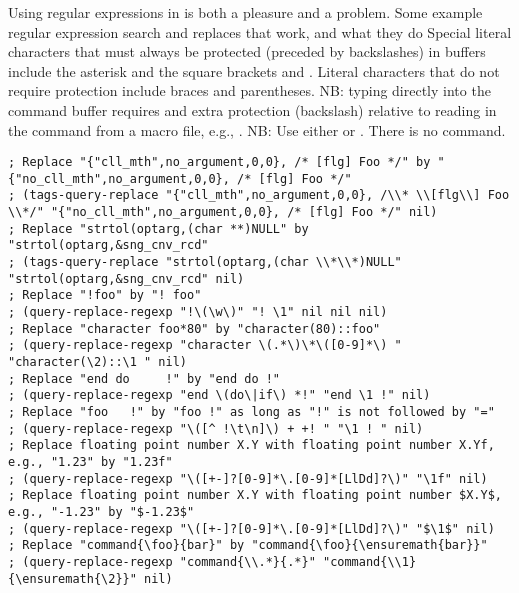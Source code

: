 \documentclass[12pt,twoside]{article}
\begin{document}
Using regular expressions in  is both a pleasure and a
problem. 
Some example regular expression search and replaces that work, and
what they do
Special literal characters that must always be protected (preceded by
backslashes) in  buffers include the asterisk
\kbdprn{*} and the square brackets \kbdprn{[} and \kbdprn{]}.
Literal characters that do not require protection include braces
and parentheses.
NB: typing directly into the  command buffer requires
and extra protection (backslash) relative to reading in the command
from a macro file, e.g., .
NB: Use either  or
.
There is no  command.
\begin{verbatim}
; Replace "{"cll_mth",no_argument,0,0}, /* [flg] Foo */" by "{"no_cll_mth",no_argument,0,0}, /* [flg] Foo */"
; (tags-query-replace "{"cll_mth",no_argument,0,0}, /\\* \\[flg\\] Foo \\*/" "{"no_cll_mth",no_argument,0,0}, /* [flg] Foo */" nil)
; Replace "strtol(optarg,(char **)NULL" by "strtol(optarg,&sng_cnv_rcd"
; (tags-query-replace "strtol(optarg,(char \\*\\*)NULL" "strtol(optarg,&sng_cnv_rcd" nil)
; Replace "!foo" by "! foo"
; (query-replace-regexp "!\(\w\)" "! \1" nil nil nil)
; Replace "character foo*80" by "character(80)::foo"
; (query-replace-regexp "character \(.*\)\*\([0-9]*\) " "character(\2)::\1 " nil)
; Replace "end do     !" by "end do !"
; (query-replace-regexp "end \(do\|if\) *!" "end \1 !" nil)
; Replace "foo   !" by "foo !" as long as "!" is not followed by "="
; (query-replace-regexp "\([^ !\t\n]\) + +! " "\1 ! " nil)
; Replace floating point number X.Y with floating point number X.Yf, e.g., "1.23" by "1.23f"
; (query-replace-regexp "\([+-]?[0-9]*\.[0-9]*[LlDd]?\)" "\1f" nil)
; Replace floating point number X.Y with floating point number $X.Y$, e.g., "-1.23" by "$-1.23$"
; (query-replace-regexp "\([+-]?[0-9]*\.[0-9]*[LlDd]?\)" "$\1$" nil)
; Replace "command{\foo}{bar}" by "command{\foo}{\ensuremath{bar}}"
; (query-replace-regexp "command{\\.*}{.*}" "command{\\1}{\ensuremath{\2}}" nil)
\end{verbatim}
\end{document}
